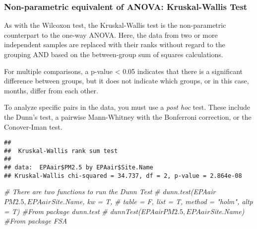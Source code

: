 \documentclass[]{article}
\newenvironment{Shaded}{\begin{snugshade}}{\end{snugshade}}
\newcommand{\KeywordTok}[1]{\textcolor[rgb]{0.13,0.29,0.53}{\textbf{#1}}}
\newcommand{\DecValTok}[1]{\textcolor[rgb]{0.00,0.00,0.81}{#1}}
\newcommand{\FloatTok}[1]{\textcolor[rgb]{0.00,0.00,0.81}{#1}}
\newcommand{\StringTok}[1]{\textcolor[rgb]{0.31,0.60,0.02}{#1}}
\newcommand{\CommentTok}[1]{\textcolor[rgb]{0.56,0.35,0.01}{\textit{#1}}}
\newcommand{\OperatorTok}[1]{\textcolor[rgb]{0.81,0.36,0.00}{\textbf{#1}}}
\newcommand{\NormalTok}[1]{#1}
\begin{document}
\subsubsection{Non-parametric equivalent of ANOVA: Kruskal-Wallis
Test}\label{non-parametric-equivalent-of-anova-kruskal-wallis-test}

As with the Wilcoxon test, the Kruskal-Wallis test is the non-parametric
counterpart to the one-way ANOVA. Here, the data from two or more
independent samples are replaced with their ranks without regard to the
grouping AND based on the between-group sum of squares calculations.

For multiple comparisons, a p-value \textless{} 0.05 indicates that
there is a significant difference between groups, but it does not
indicate which groups, or in this case, months, differ from each other.

To analyze specific pairs in the data, you must use a \emph{post hoc}
test. These include the Dunn's test, a pairwise Mann-Whitney with the
Bonferroni correction, or the Conover-Iman test.

\begin{Shaded}
\end{Shaded}

\begin{verbatim}
## 
##  Kruskal-Wallis rank sum test
## 
## data:  EPAair$PM2.5 by EPAair$Site.Name
## Kruskal-Wallis chi-squared = 34.737, df = 2, p-value = 2.864e-08
\end{verbatim}

\begin{Shaded}
\begin{Highlighting}[]
\CommentTok{# There are two functions to run the Dunn Test}
\CommentTok{# dunn.test(EPAair$PM2.5, EPAair$Site.Name, kw = T, }
\CommentTok{#           table = F, list = T, method = "holm", altp = T)   #From package dunn.test}
\CommentTok{# dunnTest(EPAair$PM2.5, EPAair$Site.Name)                    #From package FSA}
\end{Highlighting}
\end{Shaded}
\end{document}
